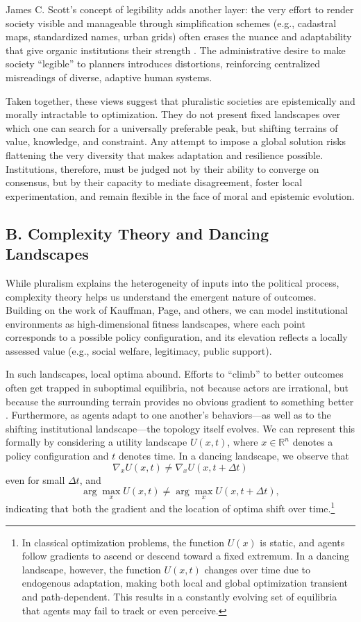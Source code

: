 \documentclass[12pt]{article}  %
\begin{document}
James C. Scott’s concept of legibility adds another layer: the very effort to render society visible and manageable through simplification schemes (e.g., cadastral maps, standardized names, urban grids) often erases the nuance and adaptability that give organic institutions their strength \parencite{scott1998seeing}. The administrative desire to make society “legible” to planners introduces distortions, reinforcing centralized misreadings of diverse, adaptive human systems.

Taken together, these views suggest that pluralistic societies are epistemically and morally intractable to optimization. They do not present fixed landscapes over which one can search for a universally preferable peak, but shifting terrains of value, knowledge, and constraint. Any attempt to impose a global solution risks flattening the very diversity that makes adaptation and resilience possible. Institutions, therefore, must be judged not by their ability to converge on consensus, but by their capacity to mediate disagreement, foster local experimentation, and remain flexible in the face of moral and epistemic evolution.

\subsection*{B. Complexity Theory and Dancing Landscapes}

While pluralism explains the heterogeneity of inputs into the political process, complexity theory helps us understand the emergent nature of outcomes. Building on the work of Kauffman, Page, and others, we can model institutional environments as high-dimensional fitness landscapes, where each point corresponds to a possible policy configuration, and its elevation reflects a locally assessed value (e.g., social welfare, legitimacy, public support).

In such landscapes, local optima abound. Efforts to “climb” to better outcomes often get trapped in suboptimal equilibria, not because actors are irrational, but because the surrounding terrain provides no obvious gradient to something better \parencite{kauffman1993origins}. Furthermore, as agents adapt to one another’s behaviors—as well as to the shifting institutional landscape—the topology itself evolves. We can represent this formally by considering a utility landscape \( U(x, t) \), where \( x \in \mathbb{R}^n \) denotes a policy configuration and \( t \) denotes time. In a dancing landscape, we observe that
\[
\nabla_x U(x, t) \neq \nabla_x U(x, t + \Delta t)
\]
even for small \( \Delta t \), and
\[
\arg\max_x U(x, t) \neq \arg\max_x U(x, t + \Delta t),
\]
indicating that both the gradient and the location of optima shift over time.\footnote{In classical optimization problems, the function \( U(x) \) is static, and agents follow gradients to ascend or descend toward a fixed extremum. In a dancing landscape, however, the function \( U(x, t) \) changes over time due to endogenous adaptation, making both local and global optimization transient and path-dependent. This results in a constantly evolving set of equilibria that agents may fail to track or even perceive.}
\end{document}
